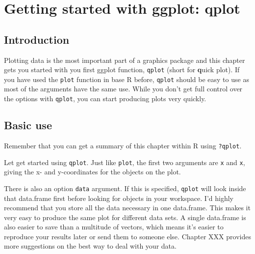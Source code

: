 


\dominitoc \faketableofcontents

\chapter{Getting started with ggplot: qplot}


\section{Introduction}

Plotting data is the most important part of a graphics package and this chapter gets you started with you first ggplot function, {\tt qplot} (short for {\bf q}uick plot).  If you have used the {\tt plot} function in base R before, {\tt qplot} should be easy to use as most of the arguments have the same use.  While you don't get full control over the options with {\tt qplot}, you can start producing plots very quickly. 

\section{Basic use}\label{sec:basic_use}

Remember that you can get a summary of this chapter within R using {\tt ?qplot}.

Let get started using {\tt qplot}.  Just like {\tt plot}, the first two arguments are {\tt x} and {\tt x}, giving the x- and y-coordinates for the objects on the plot.  

There is also an option {\tt data} argument.  If this is specified, {\tt qplot} will look inside that data.frame first before looking for objects in your workspace.  I'd highly recommend that you store all the data necessary in one data.frame.  This makes it very easy to produce the same plot for different data sets.  A single data.frame is also easier to save than a multitude of vectors, which means it's easier to reproduce your results later or send them to someone else.  Chapter XXX provides more suggestions on the best way to deal with your data.  

